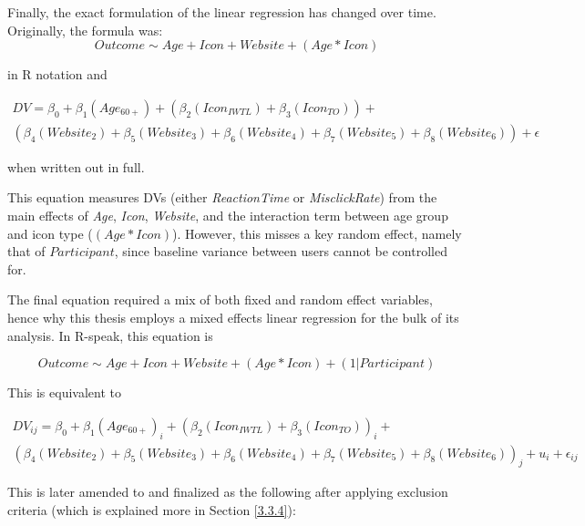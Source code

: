 \documentclass[12pt,twoside]{reedthesis}
\begin{document}
    Finally, the exact formulation of the linear regression has changed over time. Originally, the formula was:
    $$Outcome\sim Age + Icon + Website +(Age * Icon)$$ 
    
    in R notation and 
    
    \begin{gather*}
        DV = \beta_0 + \beta_1(Age_{60+})+(\beta_2(Icon_{IWTL})+\beta_3(Icon_{TO}))+\\(\beta_4(Website_2)+\beta_5(Website_3)+\beta_6(Website_4) + \beta_7(Website_5) + \beta_8(Website_6)) + \epsilon
    \end{gather*}

    when written out in full.
    
    This equation measures DVs (either \textit{ReactionTime} or \textit{MisclickRate}) from the main effects of \textit{Age}, \textit{Icon}, \textit{Website}, and the interaction term between age group and icon type ($(Age*Icon)$). However, this misses a key random effect, namely that of $Participant$, since baseline variance between users cannot be controlled for.

    The final equation required a mix of both fixed and random effect variables, hence why this thesis employs a mixed effects linear regression for the bulk of its analysis. In R-speak, this equation is 
    
    $$Outcome\sim Age + Icon + Website +(Age * Icon) + (1|Participant)$$
    
    This is equivalent to

    \begin{gather*}
        DV_{ij} = \beta_0 + \beta_1(Age_{60+})_i+(\beta_2(Icon_{IWTL})+\beta_3(Icon_{TO}))_i+\\(\beta_4(Website_2)+\beta_5(Website_3)+\beta_6(Website_4) + \beta_7(Website_5) + \beta_8(Website_6))_j + u_i + \epsilon_{ij}
    \end{gather*}

    This is later amended to and finalized as the following after applying exclusion criteria (which is explained more in Section \ref{3.3.4}):\\
    \begin{center}
        \\
    \end{center}
    \bigbreak
    
\end{document}
